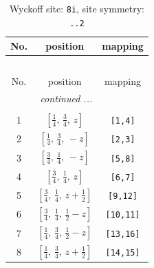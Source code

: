 \documentclass[fleqn,8pt]{jsarticle}
\begin{document}
\begin{longtable}{ccc}
\caption{Wyckoff site: {\tt 8i}, site symmetry: {\tt ..2}}
 \\
 \hline \hline
No. & position & mapping \\ \hline \endfirsthead

\multicolumn{2}{l}{\tablename\ \thetable{}} \\
 \hline \hline
No. & position & mapping \\ \hline \endhead

 \hline \hline
\multicolumn{2}{r}{\footnotesize\it continued ...} \\ \endfoot

 \hline \hline
\multicolumn{2}{r}{} \\ \endlastfoot

1 & $\left[ \frac{1}{4},\, \frac{3}{4},\, z \right]$ & {\tt [1,4]} \\ \hline
2 & $\left[ \frac{1}{4},\, \frac{3}{4},\, - z \right]$ & {\tt [2,3]} \\ \hline
3 & $\left[ \frac{3}{4},\, \frac{1}{4},\, - z \right]$ & {\tt [5,8]} \\ \hline
4 & $\left[ \frac{3}{4},\, \frac{1}{4},\, z \right]$ & {\tt [6,7]} \\ \hline
5 & $\left[ \frac{3}{4},\, \frac{1}{4},\, z + \frac{1}{2} \right]$ & {\tt [9,12]} \\ \hline
6 & $\left[ \frac{3}{4},\, \frac{1}{4},\, \frac{1}{2} - z \right]$ & {\tt [10,11]} \\ \hline
7 & $\left[ \frac{1}{4},\, \frac{3}{4},\, \frac{1}{2} - z \right]$ & {\tt [13,16]} \\ \hline
8 & $\left[ \frac{1}{4},\, \frac{3}{4},\, z + \frac{1}{2} \right]$ & {\tt [14,15]} \\
\end{longtable}
\renewcommand{\arraystretch}{1.2}
\end{document}
